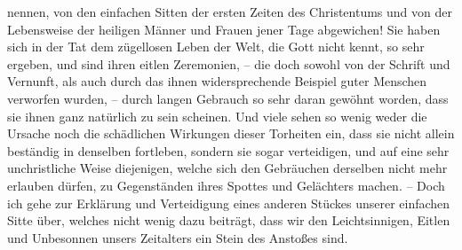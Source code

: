 nennen, von den einfachen Sitten der ersten Zeiten des Christentums und von
der Lebensweise der heiligen Männer und Frauen jener Tage abgewichen! Sie haben
sich in der Tat dem zügellosen Leben der Welt, die Gott nicht kennt, so sehr
ergeben, und sind ihren eitlen Zeremonien, -- die doch sowohl von der Schrift
und Vernunft, als auch durch das ihnen widersprechende Beispiel guter Menschen
verworfen wurden, -- durch langen Gebrauch so sehr daran gewöhnt worden, dass
sie ihnen ganz natürlich zu sein scheinen. Und viele sehen so wenig weder die
Ursache noch die schädlichen Wirkungen dieser Torheiten ein, dass sie nicht
allein beständig in denselben fortleben, sondern sie sogar verteidigen,
und auf eine sehr unchristliche Weise diejenigen, welche sich den Gebräuchen
derselben nicht mehr erlauben dürfen, zu Gegenständen ihres Spottes und
Gelächters machen. -- Doch ich gehe zur Erklärung und Verteidigung eines anderen
Stückes unserer einfachen Sitte über, welches nicht wenig dazu beiträgt, dass
wir den Leichtsinnigen, Eitlen und Unbesonnen unsers Zeitalters ein Stein des
Anstoßes sind.




